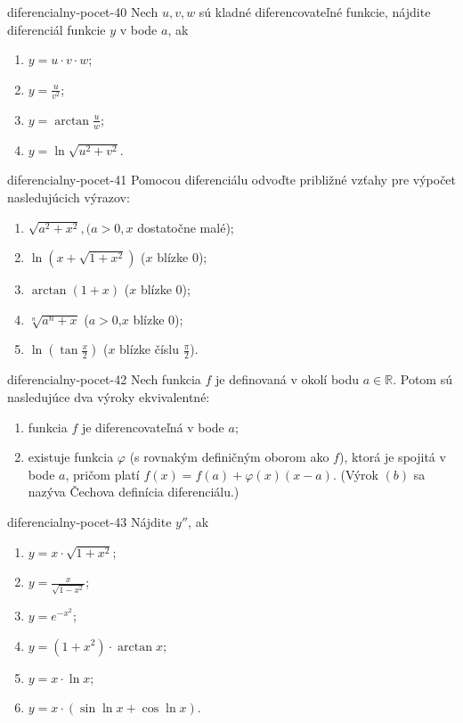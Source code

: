 \begin{defproblem}{diferencialny-pocet-40}
Nech $u,v,w$ sú kladné diferencovateľné funkcie, nájdite diferenciál funkcie $y$ v bode $a$, ak
\begin{multicols}{2}
\begin{enumerate}
    \item $y=u\cdot v\cdot w$;
    \item $y=\frac{u}{v^2}$;
    \item $y=\arctan \frac{u}{w}$;
    \item $y=\ln \sqrt{u^2+v^2}$.
\end{enumerate}
\end{multicols}
\end{defproblem}

\begin{defproblem}{diferencialny-pocet-41}
Pomocou diferenciálu odvoďte približné vzťahy pre výpočet nasledujúcich výrazov:
\begin{enumerate}
\item $\sqrt{a^2+x^2},(a>0,x$ dostatočne malé); 
\item $\ln (x+\sqrt{1+x^2})$ ($x$ blízke $0$);
\item $\arctan (1+x)$ ($x$ blízke $0$);
\item $\sqrt[n]{a^n+x}$ ($a>0$,$x$ blízke $0$);
\item$\ln (\tan \frac{x}{2})$ ($x$ blízke číslu $\frac{\pi}{2}$).
\end{enumerate}
\end{defproblem}

\begin{defproblem}{diferencialny-pocet-42}
Nech funkcia $f$ je definovaná v okolí bodu $a\in\mathbb{R}$. Potom sú nasledujúce dva výroky ekvivalentné:
\begin{enumerate}
\item funkcia $f$ je diferencovateľná v bode $a$;
\item existuje funkcia $\varphi$ (s rovnakým definičným oborom ako $f$), ktorá je spojitá v bode $a$, pričom platí $f(x)=f(a)+\varphi(x)(x-a)$.
(Výrok $(b)$ sa nazýva Čechova definícia diferenciálu.)
\end{enumerate}
\end{defproblem}

\begin{defproblem}{diferencialny-pocet-43}
Nájdite $y''$, ak
\begin{multicols}{2}
\begin{enumerate}
    \item $y=x\cdot \sqrt{1+x^2}$;
    \item $y=\frac{x}{\sqrt{1-x^2}}$;
    \item $y=e^{-x^2}$;
    \item $y=(1+x^2)\cdot \arctan x$;
    \item $y=x\cdot \ln x$;
    \item $y=x\cdot(\sin \ln x+\cos \ln x)$.
\end{enumerate}
\end{multicols}
\end{defproblem}

